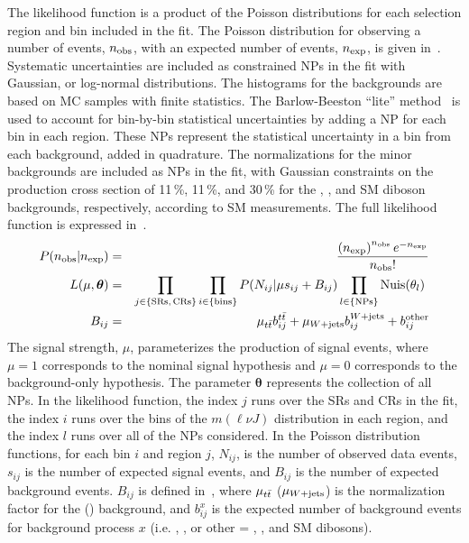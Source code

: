 The likelihood function is a product of the Poisson distributions for each selection region and bin included in the fit. The Poisson distribution for observing a number of events, $n_{\rm obs}$, with an expected number of events, $n_{\rm exp}$, is given in~\Eqn{\ref{eq:pois_prob}}. Systematic uncertainties are included as constrained NPs in the fit with Gaussian, or log-normal distributions. 
The histograms for the backgrounds are based on MC samples with finite statistics. The Barlow-Beeston ``lite'' method~\cite{bin_stats} is used to account for bin-by-bin statistical uncertainties by adding a NP for each bin in each region. These NPs represent the statistical uncertainty in a bin from each background, added in quadrature.
The normalizations for the minor backgrounds are included as NPs in the fit, with Gaussian constraints on the production cross section of 11\,\%, 11\,\%, and 30\,\% for the \Zjets, \Singlet, and SM diboson backgrounds, respectively, according to SM measurements. The full likelihood function is expressed in~\Eqn{\ref{eq:lh_func}}.
\begin{eqnarray}
P(n_{\rm obs}|n_{\rm exp}) &=& \frac{\left(n_{\rm exp}\right)^{n_{\rm obs}}e^{-n_{\rm exp}}}{n_{\rm obs}!} \label{eq:pois_prob}\\
L(\mu,\bm{\theta})&=&\prod_{j\in\{\rm SRs,\, CRs\}}\prod_{i\in\{\rm bins\}} P(N_{ij}|\mu s_{ij}+ B_{ij})\prod_{l\in\{\rm NPs\}}{\rm Nuis}(\theta_l) \label{eq:lh_func} \\
B_{ij}&=&\mu_{\ttbar} b_{ij}^{\ttbar} + \mu_{\Wjets}b_{ij}^{\Wjets}+ b_{ij}^{\rm other} \label{eq:bkg_exp}
\end{eqnarray}
The signal strength, $\mu$, parameterizes the production of signal events, where $\mu=1$ corresponds to the nominal signal hypothesis and $\mu=0$ corresponds to the background-only hypothesis.  The parameter $\bm{\theta}$ represents the collection of all NPs. In the likelihood function, the index $j$ runs over the SRs and CRs in the fit, the index $i$ runs over the bins of the $m(\ell\nu J)$ distribution in each region, and the index $l$ runs over all of the NPs considered. In the Poisson distribution functions, for each bin $i$ and region $j$, $N_{ij}$, is the number of observed data events, $s_{ij}$ is the number of expected signal events, and $B_{ij}$ is the number of expected background events. $B_{ij}$ is defined in~\Eqn{\ref{eq:bkg_exp}}, where $\mu_{t\bar{t}}$ ($\mu_{W+\textrm{jets}}$) is the normalization factor for the \ttbar (\Wjets) background, and $b_{ij}^{x}$ is the expected number of background events for background process $x$ (i.e. \ttbar, \Wjets, or other = \Singlet, \Zjets, and SM dibosons). 


